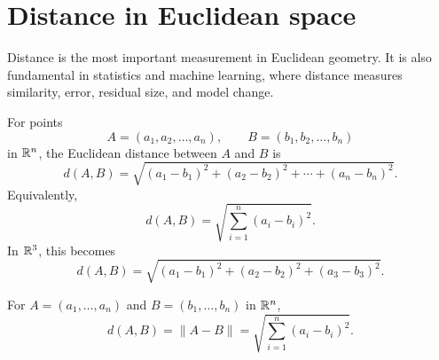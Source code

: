 \section{Distance in Euclidean space}

Distance is the most important measurement in Euclidean geometry. It is also fundamental in statistics and machine learning, where distance measures similarity, error, residual size, and model change.

For points
\[
  A=(a_1,a_2,\ldots,a_n),\qquad B=(b_1,b_2,\ldots,b_n)
\]
in $\mathbb{R}^n$, the Euclidean distance between $A$ and $B$ is
\[
  d(A,B)=\sqrt{(a_1-b_1)^2+(a_2-b_2)^2+\cdots+(a_n-b_n)^2}.
\]
Equivalently,
\[
  d(A,B)=\sqrt{\sum_{i=1}^n(a_i-b_i)^2}.
\]
In $\mathbb{R}^3$, this becomes
\[
  d(A,B)=\sqrt{(a_1-b_1)^2+(a_2-b_2)^2+(a_3-b_3)^2}.
\]

\begin{definitionbox}[title={Euclidean distance}]
For $A=(a_1,\ldots,a_n)$ and $B=(b_1,\ldots,b_n)$ in $\mathbb{R}^n$,
\[
  d(A,B)=\|A-B\|=\sqrt{\sum_{i=1}^{n}(a_i-b_i)^2}.
\]
\end{definitionbox}


